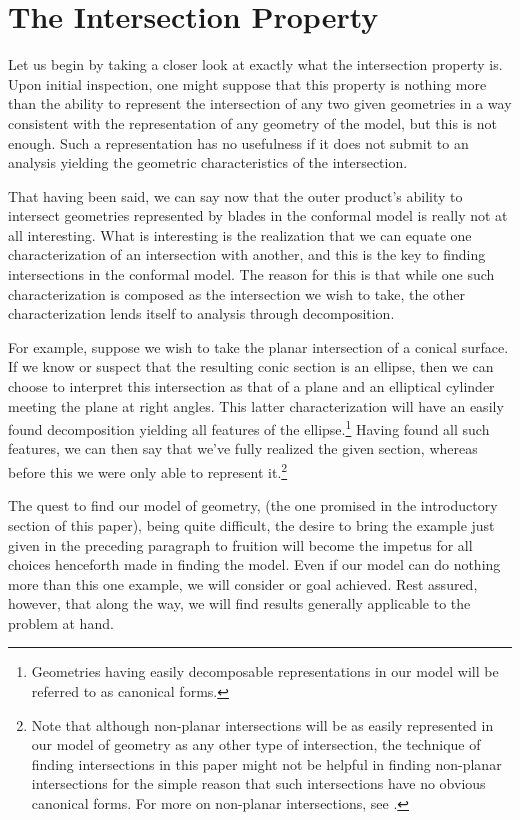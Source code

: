 \documentclass{birkjour}
\theoremstyle{definition}
\theoremstyle{remark}
\numberwithin{equation}{section}
\begin{document}
\section{The Intersection Property}

Let us begin by taking a closer look at exactly what the intersection property is.
Upon initial inspection, one might suppose that this property is nothing more than
the ability to represent the intersection of any two given geometries in a way consistent
with the representation of any geometry of the model, but this is not
enough.  Such a representation has no usefulness if it does not submit to an
analysis yielding the geometric characteristics of the intersection.

That having been said, we can say now that the outer product's ability to intersect geometries represented
by blades in the conformal model is really not at all interesting.  What is interesting
is the realization that we can equate one characterization of an intersection
with another, and this is the key to finding intersections in the conformal model.
The reason for this is that while one such characterization is composed as the
intersection we wish to take, the other characterization lends itself to
analysis through decomposition.

For example, suppose we wish to take the planar intersection of a conical surface.
If we know or suspect that the resulting conic section is an ellipse, then we can choose to
interpret this intersection as that of a plane and an elliptical cylinder meeting
the plane at right angles.  This latter characterization will have an easily found decomposition
yielding all features of the ellipse.\footnote{Geometries having easily decomposable
representations in our model will be referred to as canonical forms.}
Having found all such features, we can then say that we've
fully realized the given section, whereas before this we were only able to
represent it.\footnote{Note that although non-planar intersections will be as easily
represented in our model of geometry as any other type of intersection,
the technique of finding intersections in this paper
might not be helpful in finding non-planar intersections for the simple reason that such intersections
have no obvious canonical forms.  For more on non-planar intersections, see \cite{Miller87}.}

The quest to find our model of geometry, (the one promised in the introductory section of
this paper), being quite difficult, the desire to bring the example just given in the preceding paragraph
to fruition will become the impetus for all choices henceforth made in finding the model.
Even if our model can do nothing more than this one example, we will consider or goal achieved.
Rest assured, however, that along the way, we will find results generally applicable to the problem at hand.
\end{document}
